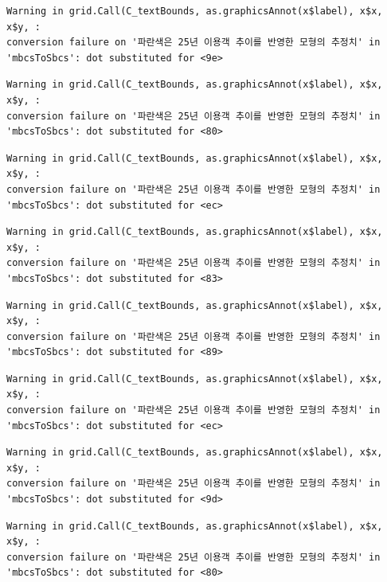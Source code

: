 \documentclass[
  letterpaper,
  DIV=11,
  numbers=noendperiod]{scrreprt}
\begin{document}
\begin{verbatim}
Warning in grid.Call(C_textBounds, as.graphicsAnnot(x$label), x$x, x$y, :
conversion failure on '파란색은 25년 이용객 추이를 반영한 모형의 추정치' in
'mbcsToSbcs': dot substituted for <9e>
\end{verbatim}

\begin{verbatim}
Warning in grid.Call(C_textBounds, as.graphicsAnnot(x$label), x$x, x$y, :
conversion failure on '파란색은 25년 이용객 추이를 반영한 모형의 추정치' in
'mbcsToSbcs': dot substituted for <80>
\end{verbatim}

\begin{verbatim}
Warning in grid.Call(C_textBounds, as.graphicsAnnot(x$label), x$x, x$y, :
conversion failure on '파란색은 25년 이용객 추이를 반영한 모형의 추정치' in
'mbcsToSbcs': dot substituted for <ec>
\end{verbatim}

\begin{verbatim}
Warning in grid.Call(C_textBounds, as.graphicsAnnot(x$label), x$x, x$y, :
conversion failure on '파란색은 25년 이용객 추이를 반영한 모형의 추정치' in
'mbcsToSbcs': dot substituted for <83>
\end{verbatim}

\begin{verbatim}
Warning in grid.Call(C_textBounds, as.graphicsAnnot(x$label), x$x, x$y, :
conversion failure on '파란색은 25년 이용객 추이를 반영한 모형의 추정치' in
'mbcsToSbcs': dot substituted for <89>
\end{verbatim}

\begin{verbatim}
Warning in grid.Call(C_textBounds, as.graphicsAnnot(x$label), x$x, x$y, :
conversion failure on '파란색은 25년 이용객 추이를 반영한 모형의 추정치' in
'mbcsToSbcs': dot substituted for <ec>
\end{verbatim}

\begin{verbatim}
Warning in grid.Call(C_textBounds, as.graphicsAnnot(x$label), x$x, x$y, :
conversion failure on '파란색은 25년 이용객 추이를 반영한 모형의 추정치' in
'mbcsToSbcs': dot substituted for <9d>
\end{verbatim}

\begin{verbatim}
Warning in grid.Call(C_textBounds, as.graphicsAnnot(x$label), x$x, x$y, :
conversion failure on '파란색은 25년 이용객 추이를 반영한 모형의 추정치' in
'mbcsToSbcs': dot substituted for <80>
\end{verbatim}
\end{document}
